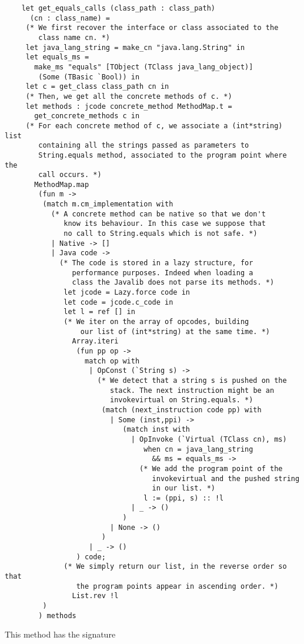 \documentclass{article}
\begin{document}
\begin{verbatim}
    let get_equals_calls (class_path : class_path)
      (cn : class_name) =
     (* We first recover the interface or class associated to the
        class name cn. *)
     let java_lang_string = make_cn "java.lang.String" in
     let equals_ms =
       make_ms "equals" [TObject (TClass java_lang_object)]
        (Some (TBasic `Bool)) in
     let c = get_class class_path cn in
     (* Then, we get all the concrete methods of c. *)
     let methods : jcode concrete_method MethodMap.t =
       get_concrete_methods c in
     (* For each concrete method of c, we associate a (int*string) list
        containing all the strings passed as parameters to
        String.equals method, associated to the program point where the
        call occurs. *)
       MethodMap.map
        (fun m ->
         (match m.cm_implementation with
           (* A concrete method can be native so that we don't
              know its behaviour. In this case we suppose that
              no call to String.equals which is not safe. *)
           | Native -> []
           | Java code ->
             (* The code is stored in a lazy structure, for
                performance purposes. Indeed when loading a
                class the Javalib does not parse its methods. *)
              let jcode = Lazy.force code in
              let code = jcode.c_code in
              let l = ref [] in
              (* We iter on the array of opcodes, building
                  our list of (int*string) at the same time. *)
                Array.iteri
                 (fun pp op ->
                   match op with
                    | OpConst (`String s) ->
                      (* We detect that a string s is pushed on the
                         stack. The next instruction might be an
                         invokevirtual on String.equals. *)
                       (match (next_instruction code pp) with
                         | Some (inst,ppi) ->
                            (match inst with
                              | OpInvoke (`Virtual (TClass cn), ms)
                                 when cn = java_lang_string
                                   && ms = equals_ms ->
                                (* We add the program point of the
                                   invokevirtual and the pushed string
                                   in our list. *)
                                 l := (ppi, s) :: !l
                              | _ -> ()
                            )
                         | None -> ()
                       )
                    | _ -> ()
                 ) code;
              (* We simply return our list, in the reverse order so that
                 the program points appear in ascending order. *)
                List.rev !l
         )
        ) methods
\end{verbatim}
This method has the signature
\end{document}
